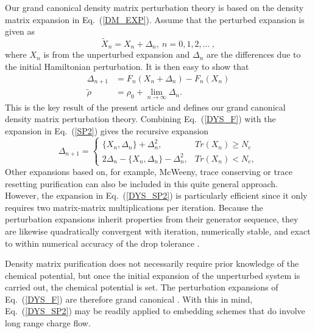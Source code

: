 \documentclass[prl,aps,twocolumn,showpacs,twocolumngrid,superbib]{revtex4}
\begin{document}
Our grand canonical density matrix perturbation theory is based on 
the density matrix expansion in Eq.\ (\ref{DM_EXP}).
Assume that the perturbed expansion is given as
\begin{equation}\label{dX}
{\widetilde X_n} = X_n + \Delta_n, ~ n = 0,1,2,\ldots~,
\end{equation}
where $X_n$ is from the unperturbed expansion 
and $\Delta_n$ are the differences due to the initial Hamiltonian
perturbation. It is then easy to show that 
\begin{equation}\label{DYS_F}\begin{array}{ll}
\Delta_{n+1} &= F_n(X_n + \Delta_n) - F_n(X_n)\\
{\widetilde \rho} &= \rho_0 + \lim_{n \rightarrow \infty} \Delta_n. \end{array}
\end{equation}
This is the key result of the present
article and defines our grand canonical density matrix perturbation theory.
Combining Eq.\ (\ref{DYS_F}) with the expansion in Eq.\ (\ref{SP2}) gives 
the recursive expansion \cite{Notation}
\begin{equation} \label{DYS_SP2}
\Delta_{n+1} = 
\left\{\begin{array}{ll}
\{ X_n,\Delta_n\} + \Delta_n^2, &  Tr(X_n) \geq N_e \\
2\Delta_n - \{ X_n,\Delta_n\} - \Delta_n^2, & Tr( X_n) < N_e,
\end{array} \right.
\end{equation}
Other expansions based on, for example, McWeeny, trace conserving or 
trace resetting purification \cite{McWeeny60,Palser98,NiklassonSP4}
can also be included in this quite general approach. However, the 
expansion in Eq.\ (\ref{DYS_SP2}) is particularly efficient since it only 
requires two matrix-matrix multiplications per iteration.
Because the perturbation expansions inherit properties from their 
generator sequence, they are likewise quadratically convergent with 
iteration, numerically stable, and exact to within numerical accuracy 
of the drop tolerance \cite{NiklassonSP4}.

Density matrix purification does not necessarily require
prior knowledge of the chemical potential, but once the
initial expansion of the unperturbed system is carried out, the
chemical potential is set. The perturbation expansions of 
Eq.\ (\ref{DYS_F}) are therefore grand canonical \cite{CPRT}.
With this in mind, Eq.~(\ref{DYS_SP2}) may be readily applied 
to embedding schemes that do involve long range charge flow.
\end{document}
